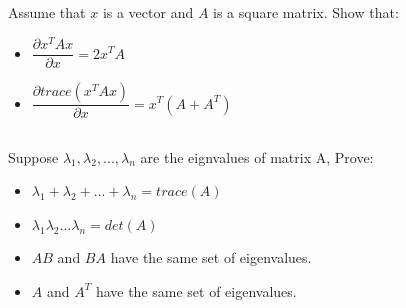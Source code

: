 \documentclass[a4paper]{article}
\begin{document}
        \subsection{}
       Assume that $x$ is a vector and $A$ is a square matrix. Show that:
        \begin{itemize}
        \item $\dfrac{\partial x^{T}Ax}{\partial x}=2x^{T}A$
        \item $\dfrac{\partial trace( x^{T}Ax)}{\partial x}=x^{T}(A+A^{T})$
        \end{itemize}

        \subsection{}
        Suppose $\lambda_{1},\lambda_{2},...,\lambda_{n}$ are the eignvalues of matrix A, Prove: 
                \begin{itemize}
        \item $\lambda_{1}+\lambda_{2}+...+\lambda_{n}=trace(A)$
        \item $\lambda_{1}\lambda_{2}...\lambda_{n}=det(A)$
        \item $AB$ and $BA$ have the same set of eigenvalues.
        \item $A$ and $A^{T}$ have the same set of eigenvalues.
        \end{itemize}
        	
\end{document}
